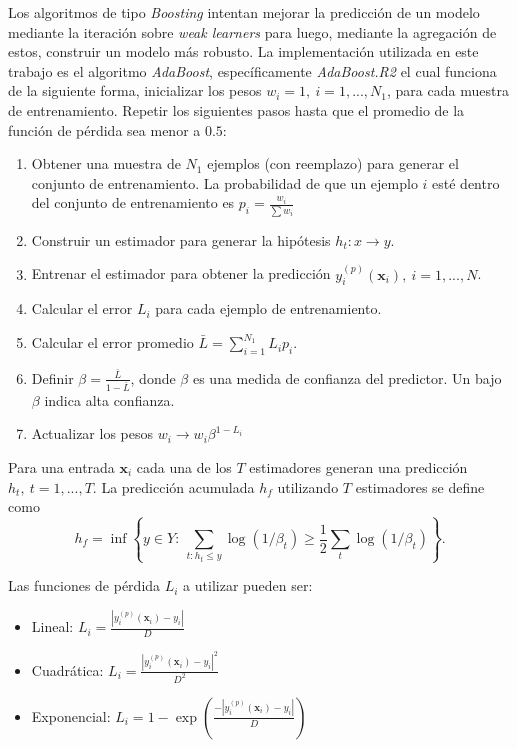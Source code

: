 \documentclass[spanish]{article}
\begin{document}
                Los algoritmos de tipo \emph{Boosting} intentan mejorar la predicción de un modelo mediante la iteración sobre \emph{weak learners}
                para luego, mediante la agregación de estos, construir un modelo más robusto. La implementación utilizada en este trabajo es
                el algoritmo \emph{AdaBoost}, específicamente \emph{AdaBoost.R2} \cite{drucker1997improving} el cual funciona de la siguiente forma, inicializar los pesos 
                $w_i=1, ~ i=1,...,N_1$, para cada muestra de entrenamiento. Repetir los siguientes pasos hasta que el promedio de la función de pérdida 
                sea menor a $0.5$:
                \begin{enumerate}
                    \item Obtener una muestra de $N_1$ ejemplos (con reemplazo) para generar el conjunto de entrenamiento. La probabilidad de que un
                        ejemplo $i$ esté dentro del conjunto de entrenamiento es $p_i=\frac{w_i}{\sum w_i}$
                    \item Construir un estimador para generar la hipótesis $h_t: x \rightarrow y$.
                    \item Entrenar el estimador para obtener la predicción $y_i^{(p)}(\textbf{x}_i), ~ i=1, ..., N$.
                    \item Calcular el error $L_i$ para cada ejemplo de entrenamiento.
                    \item Calcular el error promedio $\bar{L}=\sum_{i=1}^{N_1}L_ip_i$.
                    \item Definir $\beta=\frac{\bar{L}}{1-\bar{L}}$, donde $\beta$ es una medida de confianza del predictor. Un bajo $\beta$ indica alta
                        confianza.
                    \item Actualizar los pesos $w_i\rightarrow w_i\beta^{1-L_i}$
                \end{enumerate}
                
                Para una entrada $\textbf{x}_i$ cada una de los $T$ estimadores generan una predicción $h_t, ~ t=1, ..., T$. La predicción acumulada
                $h_f$ utilizando $T$ estimadores se define como
                \begin{equation}
                    h_f = \inf \left\{y\in Y: ~ \sum_{t:h_t\leq y} \log(1/\beta_t) \geq \frac12 \sum_{t} \log(1/\beta_t) \right\}.
                \end{equation}
                
                Las funciones de pérdida $L_i$ a utilizar pueden ser:
                \begin{itemize}
                    \item Lineal: $L_i=\frac{|y_i^{(p)}(\textbf{x}_i)-y_i|}{D}$
                    \item Cuadrática: $L_i=\frac{|y_i^{(p)}(\textbf{x}_i)-y_i|^2}{D^2}$
                    \item Exponencial: $L_i=1- \exp\left(\frac{-|y_i^{(p)}(\textbf{x}_i)-y_i|}{D}\right)$
                \end{itemize}
                
\end{document}
